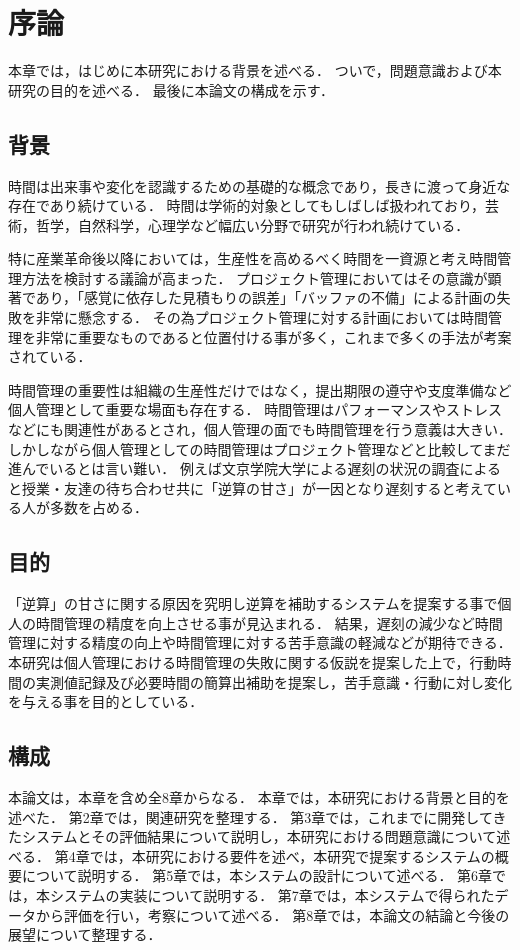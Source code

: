 \chapter{序論}
本章では，はじめに本研究における背景を述べる．
ついで，問題意識および本研究の目的を述べる．
最後に本論文の構成を示す．

\section{背景}
時間は出来事や変化を認識するための基礎的な概念であり，長きに渡って身近な存在であり続けている\cite{history}．
時間は学術的対象としてもしばしば扱われており，芸術，哲学，自然科学，心理学など幅広い分野で研究が行われ続けている．

特に産業革命後以降においては，生産性を高めるべく時間を一資源と考え時間管理方法を検討する議論が高まった\cite{Taylor1911}．
プロジェクト管理においてはその意識が顕著であり，「感覚に依存した見積もりの誤差」「バッファの不備」による計画の失敗を非常に懸念する\cite{innopm}．
その為プロジェクト管理に対する計画においては時間管理を非常に重要なものであると位置付ける事が多く，これまで多くの手法が考案されている\cite{EORMS}．

時間管理の重要性は組織の生産性だけではなく，提出期限の遵守や支度準備など個人管理として重要な場面も存在する．
時間管理はパフォーマンス\cite{Barling1996}\cite{Britton1991}\cite{Trueman1996}やストレス\cite{Macan1994}などにも関連性があるとされ，個人管理の面でも時間管理を行う意義は大きい\cite{Claessens2007}．
しかしながら個人管理としての時間管理はプロジェクト管理などと比較してまだ進んでいるとは言い難い．
例えば文京学院大学による遅刻の状況の調査によると授業・友達の待ち合わせ共に「逆算の甘さ」が一因となり遅刻すると考えている人が多数を占める\cite{bunkyo}．

\section{目的}
「逆算」の甘さに関する原因を究明し逆算を補助するシステムを提案する事で個人の時間管理の精度を向上させる事が見込まれる．
結果，遅刻の減少など時間管理に対する精度の向上や時間管理に対する苦手意識の軽減などが期待できる．
本研究は個人管理における時間管理の失敗に関する仮説を提案した上で，行動時間の実測値記録及び必要時間の簡算出補助を提案し，苦手意識・行動に対し変化を与える事を目的としている．

\section{構成}
本論文は，本章を含め全8章からなる．
本章では，本研究における背景と目的を述べた．
第2章では，関連研究を整理する．
第3章では，これまでに開発してきたシステムとその評価結果について説明し，本研究における問題意識について述べる．
第4章では，本研究における要件を述べ，本研究で提案するシステムの概要について説明する．
第5章では，本システムの設計について述べる．
第6章では，本システムの実装について説明する．
第7章では，本システムで得られたデータから評価を行い，考察について述べる．
第8章では，本論文の結論と今後の展望について整理する．